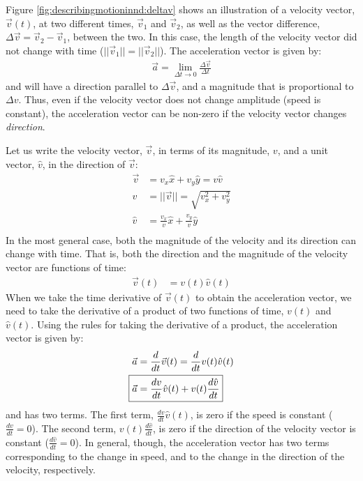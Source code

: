 Figure \ref{fig:describingmotioninnd:deltav} shows an illustration of a velocity vector, $\vec v(t)$, at two different times, $\vec v_1$ and $\vec v_2$, as well as the vector difference, $\Delta \vec v=\vec v_2 - \vec v_1$, between the two. In this case, the length of the velocity vector did not change with time ($||\vec v_1||=||\vec v_2||$). The acceleration vector is given by:
\begin{align*}
\vec a = \lim_{\Delta t\to 0}\frac{\Delta \vec v}{\Delta t}
\end{align*}
and will have a direction parallel to $\Delta \vec v$, and a magnitude that is proportional to $\Delta v$. Thus, even if the velocity vector does not change amplitude (speed is constant), the acceleration vector can be non-zero if the velocity vector changes \textit{direction}.

Let us write the velocity vector, $\vec v$, in terms of its magnitude, $v$, and a unit vector, $\hat v$, in the direction of $\vec v$:
\begin{align*}
\vec v &=v_x\hat x+v_y\hat y= v \hat v\\
v&=||\vec v||=\sqrt{v_x^2+v_y^2}\\
\hat v &= \frac{v_x}{v}\hat x+\frac{v_y}{v}\hat y\\
\end{align*}
In the most general case, both the magnitude of the velocity and its direction can change with time. That is, both the direction and the magnitude of the velocity vector are functions of time:
\begin{align*}
\vec v(t)&=v(t)\hat v(t)
\end{align*}
When we take the time derivative of $\vec v(t)$ to obtain the acceleration vector, we need to take the derivative of a product of two functions of time, $v(t)$ and $\hat v(t)$. Using the rules for taking the derivative of a product, the acceleration vector is given by:
\begin{align}
\label{eqn:describingmotioninnd:avecdef2}
\vec a &= \frac{d}{dt}\vec v(t)= \frac{d}{dt}v(t)\hat v(t)\nonumber\\
\Aboxed{\vec a&=\frac{dv}{dt}\hat v(t)+v(t)\frac{d\hat v}{dt}}
\end{align}
and has two terms. The first term, $\frac{dv}{dt}\hat v(t)$, is zero if the speed is constant ($\frac{dv}{dt}=0$). The second term, $v(t)\frac{d\hat v}{dt}$, is zero if the direction of the velocity vector is constant ($\frac{d\hat v}{dt}=0$). In general, though, the acceleration vector has two terms corresponding to the change in speed, and to the change in the direction of the velocity, respectively.

